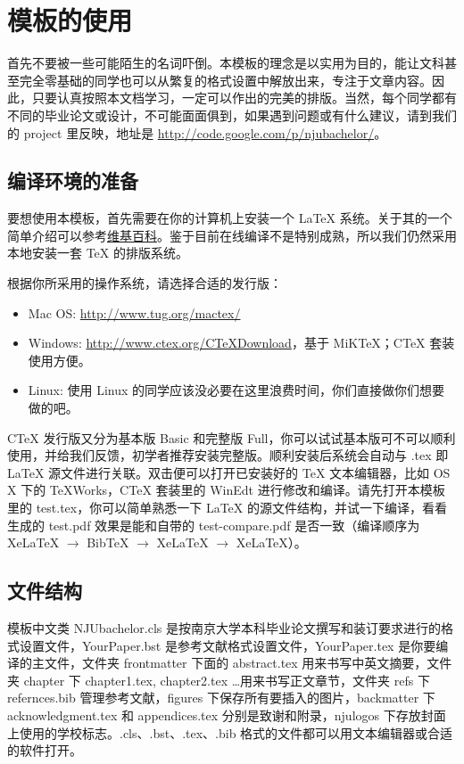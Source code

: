 \chapter{模板的使用}
首先不要被一些可能陌生的名词吓倒。本模板的理念是以实用为目的，能让文科甚至完全零基础的同学也可以从繁复的格式设置中解放出来，专注于文章内容。因此，只要认真按照本文档学习，一定可以作出的完美的排版。当然，每个同学都有不同的毕业论文或设计，不可能面面俱到，如果遇到问题或有什么建议，请到我们的 project 里反映，地址是 \url{http://code.google.com/p/njubachelor/}。

\section{编译环境的准备}
要想使用本模板，首先需要在你的计算机上安装一个 \LaTeX{} 系统。关于其的一个简单介绍可以参考\href{http://zh.wikipedia.org/wiki/Latex}{维基百科}。鉴于目前在线编译不是特别成熟，所以我们仍然采用本地安装一套 \TeX{} 的排版系统。

根据你所采用的操作系统，请选择合适的发行版：
\begin{itemize}
	\item Mac OS: \url{http://www.tug.org/mactex/}
	\item Windows: \url{http://www.ctex.org/CTeXDownload}，基于 MiKTeX；CTeX 套装使用方便。
	\item Linux: 使用 Linux 的同学应该没必要在这里浪费时间，你们直接做你们想要做的吧。
\end{itemize}
CTeX 发行版又分为基本版 Basic 和完整版 Full，你可以试试基本版可不可以顺利使用，并给我们反馈，初学者推荐安装完整版。顺利安装后系统会自动与 .tex 即 \LaTeX{} 源文件进行关联。双击便可以打开已安装好的 \TeX{} 文本编辑器，比如 OS X 下的 TeXWorks，CTeX 套装里的 WinEdt 进行修改和编译。请先打开本模板里的 test.tex，你可以简单熟悉一下 \LaTeX{} 的源文件结构，并试一下编译，看看生成的 test.pdf 效果是能和自带的 test-compare.pdf 是否一致（编译顺序为 XeLaTeX $\rightarrow$ BibTeX $\rightarrow$ XeLaTeX $\rightarrow$ XeLaTeX）。

\section{文件结构}
模板中文类 NJUbachelor.cls 是按南京大学本科毕业论文撰写和装订要求进行的格式设置文件，YourPaper.bst 是参考文献格式设置文件，YourPaper.tex 是你要编译的主文件，文件夹 frontmatter 下面的 abstract.tex 用来书写中英文摘要，文件夹 chapter 下 chapter1.tex, chapter2.tex \ldots 用来书写正文章节，文件夹 refs 下 refernces.bib 管理参考文献，figures 下保存所有要插入的图片，backmatter 下 acknowledgment.tex 和 appendices.tex 分别是致谢和附录，njulogos 下存放封面上使用的学校标志。.cls、.bst、.tex、.bib 格式的文件都可以用文本编辑器或合适的软件打开。

